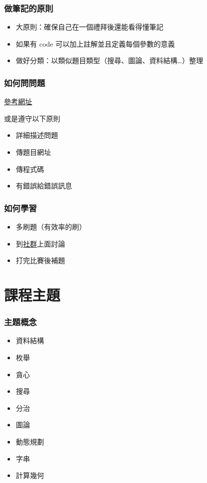 \documentclass{beamer}
\begin{document}
\begin{frame}
    \frametitle{做筆記的原則}
    \begin{itemize}
        \item 大原則：確保自己在一個禮拜後還能看得懂筆記
        \item 如果有 code 可以加上註解並且定義每個參數的意義
        \item 做好分類：以類似題目類型（搜尋、圖論、資料結構…）整理
    \end{itemize}
\end{frame}

\begin{frame}
    \frametitle{如何問問題}
    \href{https://github.com/ryanhanwu/How-To-Ask-Questions-The-Smart-Way}{參考網址}
    
    \vspace{0.5cm}
    或是遵守以下原則
    \begin{itemize}
        \item 詳細描述問題
        \item 傳題目網址
        \item 傳程式碼
        \item 有錯誤給錯誤訊息
    \end{itemize}
\end{frame}

\begin{frame}
    \frametitle{如何學習}
    \begin{itemize}
        \item 多刷題（有效率的刷）
        \item 到\href{https://discord.gg/cisc}{社群}上面討論
        \item 打完比賽後補題
    \end{itemize}
\end{frame}

\section{課程主題}

\begin{frame}
    \frametitle{主題概念}
    \begin{itemize}
        \item 資料結構
        \item 枚舉
        \item 貪心
        \item 搜尋
        \item 分治
        \item 圖論
        \item 動態規劃
        \item 字串
        \item 計算幾何
    \end{itemize}

    \vspace{0.5cm}
\end{frame}
\end{document}
